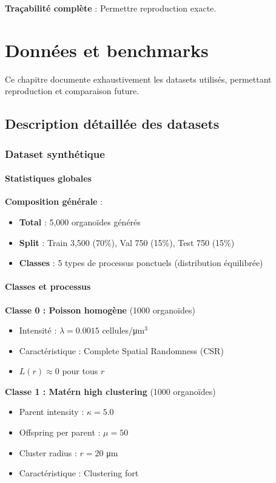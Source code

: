 \textbf{Traçabilité complète} : Permettre reproduction exacte.

\chapter{Données et benchmarks}

Ce chapitre documente exhaustivement les datasets utilisés, permettant reproduction et comparaison future.

\section{Description détaillée des datasets}

\subsection{Dataset synthétique}

\subsubsection{Statistiques globales}

\textbf{Composition générale} :
\begin{itemize}
    \item \textbf{Total} : 5,000 organoïdes générés
    \item \textbf{Split} : Train 3,500 (70\%), Val 750 (15\%), Test 750 (15\%)
    \item \textbf{Classes} : 5 types de processus ponctuels (distribution équilibrée)
\end{itemize}

\subsubsection{Classes et processus}

\textbf{Classe 0 : Poisson homogène} (1000 organoïdes)
\begin{itemize}
    \item Intensité : $\lambda = 0.0015$ cellules/μm$^3$
    \item Caractéristique : Complete Spatial Randomness (CSR)
    \item $L(r) \approx 0$ pour tous $r$
\end{itemize}

\textbf{Classe 1 : Matérn high clustering} (1000 organoïdes)
\begin{itemize}
    \item Parent intensity : $\kappa = 5.0$
    \item Offspring per parent : $\mu = 50$
    \item Cluster radius : $r = 20$ μm
    \item Caractéristique : Clustering fort
\end{itemize}

